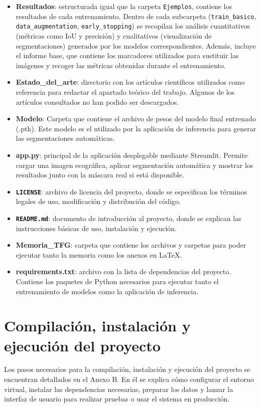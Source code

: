 \begin{itemize}
    \item \textbf{Resultados}: estructurada igual que la carpeta \texttt{Ejemplos}, contiene los resultados de cada entrenamiento. Dentro de cada subcarpeta (\texttt{train\_basico}, \texttt{data\_augmentation}, \texttt{early\_stopping}) se recopilan los análisis cuantitativos (métricas como IoU y precisión) y cualitativos (visualización de segmentaciones) generados por los modelos correspondientes. Además, incluye el informe base, que contiene los marcadores utilizados para sustituir las imágenes y recoger las métricas obtenidas durante el entrenamiento.
    \item \textbf{Estado\_del\_arte}: directorio con los artículos científicos utilizados como referencia para redactar el apartado teórico del trabajo. Algunos de los artículos consultados no han podido ser descargados. 
    \item \textbf{Modelo}: Carpeta que contiene el archivo de pesos del modelo final entrenado (.pth). Este modelo es el utilizado por la aplicación de inferencia para generar las segmentaciones automáticas.
    \item \textbf{app.py}:  principal de la aplicación desplegable mediante Streamlit. Permite cargar una imagen ecográfica, aplicar segmentación automática y mostrar los resultados junto con la máscara real si está disponible.
    \item \textbf{\texttt{LICENSE}}: archivo de licencia del proyecto, donde se especifican los términos legales de uso, modificación y distribución del código.
    \item \textbf{\texttt{README.md}}: documento de introducción al proyecto, donde se explican las instrucciones básicas de uso, instalación y ejecución.
    \item \textbf{Memoria\_TFG}: carpeta que contiene los archivos y carpetas para poder ejecutar tanto la memoria como los anexos en LaTeX. 
    \item \textbf{requirements.txt}: archivo con la lista de dependencias del proyecto. Contiene los paquetes de Python necesarios para ejecutar tanto el entrenamiento de modelos como la aplicación de inferencia. 
\end{itemize}  

\section{Compilación, instalación y ejecución del proyecto}

Los pasos necesarios para la compilación, instalación y ejecución del proyecto se encuentran detallados en el Anexo B. En él se explica cómo configurar el entorno virtual, instalar las dependencias necesarias, preparar los datos y lanzar la interfaz de usuario para realizar pruebas o usar el sistema en producción.


